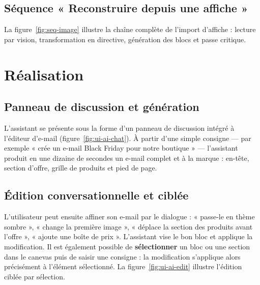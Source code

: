 \subsection{Séquence « Reconstruire depuis une affiche »}
La figure~\ref{fig:seq-image} illustre la chaîne complète de l'import
d'affiche : lecture par vision, transformation en directive, génération des
blocs et passe critique.


\section{Réalisation}

\subsection{Panneau de discussion et génération}
L'assistant se présente sous la forme d'un panneau de discussion intégré à
l'éditeur d'e-mail (figure~\ref{fig:ui-ai-chat}). À partir d'une simple
consigne — par exemple « crée un e-mail Black Friday pour notre boutique » —
l'assistant produit en une dizaine de secondes un e-mail complet et à la
marque : en-tête, section d'offre, grille de produits et pied de page.


\subsection{Édition conversationnelle et ciblée}
L'utilisateur peut ensuite affiner son e-mail par le dialogue : « passe-le
en thème sombre », « change la première image », « déplace la section des
produits avant l'offre », « ajoute une boîte de prix ». L'assistant vise le
bon bloc et applique la modification. Il est également possible de
\textbf{sélectionner} un bloc ou une section dans le canevas puis de saisir
une consigne : la modification s'applique alors précisément à l'élément
sélectionné. La figure~\ref{fig:ui-ai-edit} illustre l'édition ciblée par
sélection.


